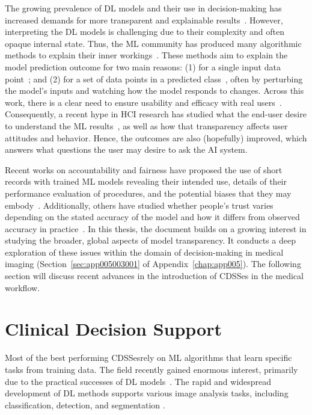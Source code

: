 The growing prevalence of \ac{DL} models and their use in decision-making has increased demands for more transparent and explainable results~\cite{10.5555/3305381.3305576}.
However, interpreting the \ac{DL} models is challenging due to their complexity and often opaque internal state.
Thus, the \ac{ML} community has produced many algorithmic methods to explain their inner workings~\cite {10.1145/2939672.2939778, pmlr-v80-kim18d}.
These methods aim to explain the model prediction outcome for two main reasons:
(1) for a single input data point~\cite{10.1145/2939672.2939778}; and
(2) for a set of data points in a predicted class~\cite{pmlr-v80-kim18d}, often by perturbing the model's inputs and watching how the model responds to changes.
Across this work, there is a clear need to ensure usability and efficacy with real users~\cite{10.1145/3173574.3174156}.
Consequently, a recent hype in \ac{HCI} research has studied what the end-user desire to understand the \ac{ML} results~\cite{10.1145/3313831.3376301}, as well as how that transparency affects user attitudes and behavior.
Hence, the outcomes are also (hopefully) improved, which answers what questions the user may desire to ask the \ac{AI} system.

Recent works on accountability and fairness have proposed the use of short records with trained \ac{ML} models revealing their intended use, details of their performance evaluation of procedures, and the potential biases that they may embody~\cite{10.1145/3351095.3375709, 10.1145/3287560.3287596}.
Additionally, others have studied whether people's trust varies depending on the stated accuracy of the model and how it differs from observed accuracy in practice~\cite{10.1145/3290605.3300509}.
In this thesis, the document builds on a growing interest in studying the broader, global aspects of model transparency.
It conducts a deep exploration of these issues within the domain of decision-making in medical imaging (Section~\ref{sec:app005003001} of Appendix~\ref{chap:app005}).
The following section will discuss recent advances in the introduction of \acp{CDSSe} in the medical workflow.

\section{Clinical Decision Support}
\label{sec:chap003003}

Most of the best performing \acp{CDSSe}\footnotemark[5] rely on \ac{ML} algorithms that learn specific tasks from training data.
The field recently gained enormous interest, primarily due to the practical successes of \ac{DL} models~\cite{meacham2019towards}.
The rapid and widespread development of \ac{DL} methods supports various image analysis tasks, including classification, detection, and segmentation \cite{lecun2015deep}.

